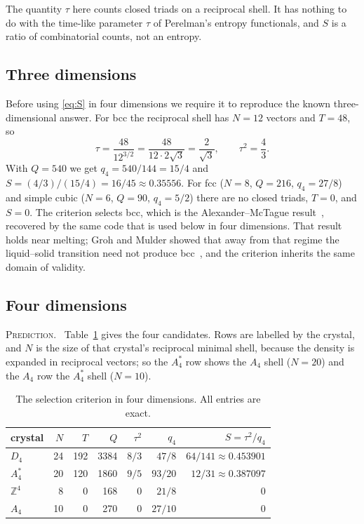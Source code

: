 \documentclass[a4paper,11pt]{article}
\makeatletter
\let\jsOldToprule\toprule
\renewcommand{\toprule}{\jsOldToprule\rowcolor{bgheader}}
\numberwithin{equation}{section}
\theoremstyle{jsplain}
\theoremstyle{jsrem}
\newcommand{\lbl}[1]{\textcolor{lbl@#1}{\textsc{#1}}.\ }
\makeatother
\begin{document}
The quantity $\tau$ here counts closed triads on a reciprocal shell. It has nothing to do with the time-like parameter $\tau$ of Perelman's entropy functionals, and $S$ is a ratio of combinatorial counts, not an entropy.

\subsection{Three dimensions}

Before using \eqref{eq:S} in four dimensions we require it to reproduce the known three-dimensional answer. For bcc the reciprocal shell has $N=12$ vectors and $T=48$, so
\[
\tau=\frac{48}{12^{3/2}}=\frac{48}{12\cdot2\sqrt3}=\frac{2}{\sqrt3},\qquad \tau^2=\frac43 .
\]
With $Q=540$ we get $q_4=540/144=15/4$ and $S=(4/3)/(15/4)=16/45\approx0.35556$. For fcc ($N=8$, $Q=216$, $q_4=27/8$) and simple cubic ($N=6$, $Q=90$, $q_4=5/2$) there are no closed triads, $T=0$, and $S=0$. The criterion selects bcc, which is the Alexander--McTague result~\cite{ref1}, recovered by the same code that is used below in four dimensions. That result holds near melting; Groh and Mulder showed that away from that regime the liquid--solid transition need not produce bcc~\cite{ref44}, and the criterion inherits the same domain of validity.

\subsection{Four dimensions}

\lbl{Prediction} Table~\ref{tab:S4} gives the four candidates. Rows are labelled by the crystal, and $N$ is the size of that crystal's reciprocal minimal shell, because the density is expanded in reciprocal vectors; so the $A_4^*$ row shows the $A_4$ shell ($N=20$) and the $A_4$ row the $A_4^*$ shell ($N=10$).

\begin{table}[htbp]
\centering
\begin{tabular}{lrrrrrr}
\toprule
crystal & $N$ & $T$ & $Q$ & $\tau^2$ & $q_4$ & $S=\tau^2/q_4$\\
\midrule
$D_4$ & 24 & 192 & 3384 & $8/3$ & $47/8$ & $64/141\approx0.453901$\\
$A_4^*$ & 20 & 120 & 1860 & $9/5$ & $93/20$ & $12/31\approx0.387097$\\
$\mathbb{Z}^4$ & 8 & 0 & 168 & $0$ & $21/8$ & $0$\\
$A_4$ & 10 & 0 & 270 & $0$ & $27/10$ & $0$\\
\bottomrule
\end{tabular}
\caption{The selection criterion in four dimensions. All entries are exact.}
\label{tab:S4}
\end{table}
\end{document}
